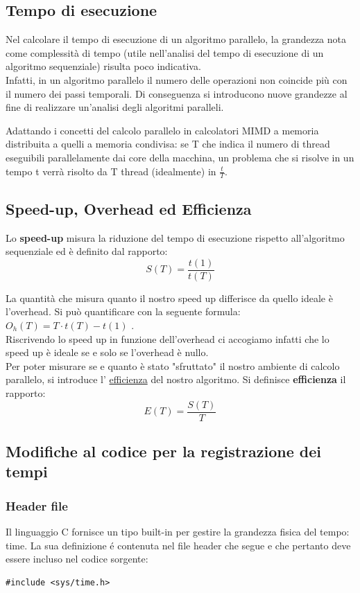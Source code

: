 \subsection{Tempo di esecuzione}

Nel calcolare il tempo di esecuzione di un algoritmo parallelo, la grandezza nota come complessità di tempo (utile nell'analisi del tempo di esecuzione di un algoritmo sequenziale) risulta poco indicativa.\\
Infatti, in un algoritmo parallelo il numero delle operazioni non coincide più con il numero dei passi temporali. Di conseguenza si introducono nuove grandezze al fine di realizzare un'analisi degli algoritmi paralleli.

Adattando i concetti del calcolo parallelo in calcolatori MIMD a memoria distribuita a quelli a memoria condivisa: se T che indica il numero di thread eseguibili parallelamente dai core della macchina, un problema che si risolve in un tempo t verrà risolto da T thread (idealmente) in $\frac{t}{T}$.

\subsection{Speed-up, Overhead ed Efficienza}

Lo \textbf{speed-up} misura la riduzione del tempo di esecuzione rispetto all'algoritmo sequenziale ed è definito dal rapporto:
$$ S(T) = \frac{t(1)}{t(T)} $$ 

La quantità che misura quanto il nostro speed up differisce da quello ideale è l'overhead. Si può quantificare con la seguente formula: $O_h(T) = T\cdot t(T) - t(1)$ .\\
Riscrivendo lo speed up in funzione dell'overhead ci accogiamo infatti che lo speed up è ideale se e solo se l'overhead è nullo.\\

Per poter misurare se e quanto è stato "sfruttato" il nostro ambiente di calcolo parallelo, si introduce l' \underline{efficienza} del nostro algoritmo.
Si definisce \textbf{efficienza} il rapporto: $$ E(T) = \frac{S(T)}{T} $$

\subsection{Modifiche al codice per la registrazione dei tempi}
\subsubsection{Header file}
Il linguaggio C fornisce un tipo built-in per gestire la grandezza fisica del tempo: time.
La sua definizione é contenuta nel file header che segue e che pertanto deve essere incluso nel codice sorgente:
\begin{lstlisting}
#include <sys/time.h>
\end{lstlisting}

